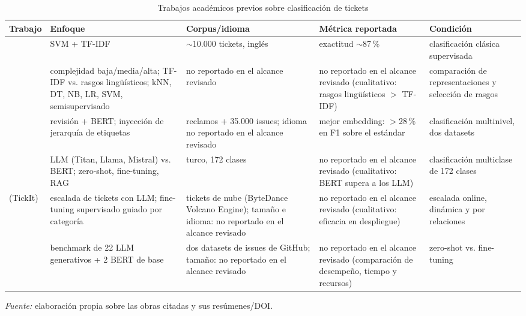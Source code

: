 \begin{table}[!ht]
\centering
\caption{Trabajos académicos previos sobre clasificación de tickets}
\label{tab:trabajos-academicos}
\small
\setlength{\tabcolsep}{4pt}
\begin{tabular}{@{}>{\raggedright\arraybackslash}p{2.1cm} >{\raggedright\arraybackslash}p{3.7cm} >{\raggedright\arraybackslash}p{3.5cm} >{\raggedright\arraybackslash}p{3.1cm} >{\raggedright\arraybackslash}p{2.2cm}@{}}
\toprule
\textbf{Trabajo} & \textbf{Enfoque} & \textbf{Corpus/idioma} & \textbf{Métrica reportada} & \textbf{Condición} \\
\midrule
\textcite{Paramesh2019_it_service_desk} & SVM + TF-IDF & $\sim$10.000 tickets, inglés & exactitud $\sim$87\,\% & clasificación clásica supervisada \\
\textcite{Revina2020_it_tickets} & complejidad baja/media/alta; TF-IDF vs. rasgos lingüísticos; kNN, DT, NB, LR, SVM, semisupervisado & no reportado en el alcance revisado & no reportado en el alcance revisado (cualitativo: rasgos lingüísticos $>$ TF-IDF) & comparación de representaciones y selección de rasgos \\
\textcite{zangari2023ticket} & revisión + BERT; inyección de jerarquía de etiquetas & 20.000 reclamos + 35.000 issues; idioma no reportado en el alcance revisado & mejor embedding: $>$28\,\% en F1 sobre el estándar & clasificación multinivel, dos datasets \\
\textcite{paket2024itservice} & LLM (Titan, Llama, Mistral) vs. BERT; zero-shot, fine-tuning, RAG & turco, 172 clases & no reportado en el alcance revisado (cualitativo: BERT supera a los LLM) & clasificación multiclase de 172 clases \\
\textcite{liu2025tickit} (TickIt) & escalada de tickets con LLM; fine-tuning supervisado guiado por categoría & tickets de nube (ByteDance Volcano Engine); tamaño e idioma: no reportado en el alcance revisado & no reportado en el alcance revisado (cualitativo: eficacia en despliegue) & escalada online, dinámica y por relaciones \\
\textcite{colavito2025benchmarking} & benchmark de 22 LLM generativos + 2 BERT de base & dos datasets de issues de GitHub; tamaño: no reportado en el alcance revisado & no reportado en el alcance revisado (comparación de desempeño, tiempo y recursos) & zero-shot vs. fine-tuning \\
\bottomrule
\end{tabular}
\par\smallskip
{\footnotesize\textit{Fuente:} elaboración propia sobre las obras citadas y sus resúmenes/DOI.\par}
\end{table}

